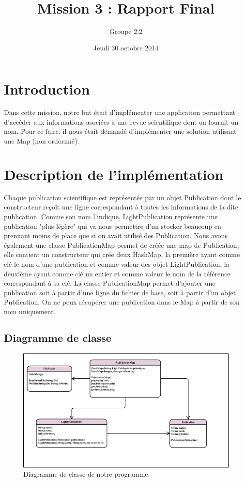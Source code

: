\documentclass[10pt,a4paper]{article}
\date{Jeudi 30 octobre 2014}
\author{Groupe 2.2}
\title{Mission 3 : Rapport Final}
\begin{document}
\maketitle
\section*{Introduction}
Dans cette mission, notre but était d'implémenter une application permettant d'accéder aux informations asociées à une revue scientifique dont on fournit un nom. Pour ce faire, il nous était demandé d'implémenter une solution utilisant une Map (non ordornné).

\section*{Description de l'implémentation}
Chaque publication scientifique est représentée par un objet Publication dont le constructeur reçoît une ligne correspondant à toutes les informations de la dite publication. Comme son nom l'indique, LightPublication représente une publication "plus légère" qui va nous permettre d'un stocker beaucoup en prennant moins de place que si on avait utilisé des Publication. Nous avons également une classe PublicationMap permet de créée une map de Publication, elle contient un constructeur qui crée deux HashMap, la première ayant comme clé le nom d'une publication et comme valeur des objet LightPublication, la deuxième ayant comme clé un entier et comme valeur le nom de la référence correspondant à sa clé. La classe PublicationMap permet d'ajouter une publication soit à partir d'une ligne du fichier de base, soit à partir d'un objet Publication. On ne peux récupérer une publication dans le Map à partir de son nom uniquement.

\subsection*{Diagramme de classe}
\begin{figure}[!h]
    \begin{center}
    \includegraphics[scale=0.5]{Diagram.png}
    \caption{Diagramme de classe de notre programme.}
    \label{fig:ClassDiagram}
    \end{center}
\end{figure}
\newpage
\end{document}
